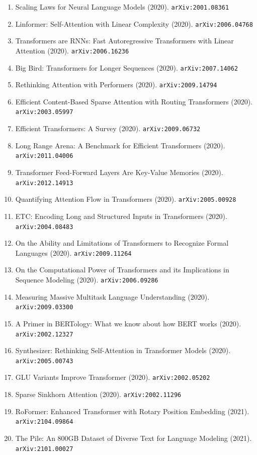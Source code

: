 \documentclass[11pt]{article}
\begin{document}
\begin{enumerate}
  \item Scaling Laws for Neural Language Models (2020). \texttt{arXiv:2001.08361}
  \item Linformer: Self-Attention with Linear Complexity (2020). \texttt{arXiv:2006.04768}
  \item Transformers are RNNs: Fast Autoregressive Transformers with Linear
  Attention (2020). \texttt{arXiv:2006.16236}
  \item Big Bird: Transformers for Longer Sequences (2020). \texttt{arXiv:2007.14062}
  \item Rethinking Attention with Performers (2020). \texttt{arXiv:2009.14794}
  \item Efficient Content-Based Sparse Attention with Routing Transformers (2020). \texttt{arXiv:2003.05997}
  \item Efficient Transformers: A Survey (2020). \texttt{arXiv:2009.06732}
  \item Long Range Arena: A Benchmark for Efficient Transformers (2020). \texttt{arXiv:2011.04006}
  \item Transformer Feed-Forward Layers Are Key-Value Memories (2020). \texttt{arXiv:2012.14913}
  \item Quantifying Attention Flow in Transformers (2020). \texttt{arXiv:2005.00928}
  \item ETC: Encoding Long and Structured Inputs in Transformers (2020). \texttt{arXiv:2004.08483}
  \item On the Ability and Limitations of Transformers to Recognize Formal
  Languages (2020). \texttt{arXiv:2009.11264}
  \item On the Computational Power of Transformers and its Implications in
  Sequence Modeling (2020). \texttt{arXiv:2006.09286}
  \item Measuring Massive Multitask Language Understanding (2020). \texttt{arXiv:2009.03300}
  \item A Primer in BERTology: What we know about how BERT works (2020). \texttt{arXiv:2002.12327}
  \item Synthesizer: Rethinking Self-Attention in Transformer Models (2020). \texttt{arXiv:2005.00743}
  \item GLU Variants Improve Transformer (2020). \texttt{arXiv:2002.05202}
  \item Sparse Sinkhorn Attention (2020). \texttt{arXiv:2002.11296}
  \item RoFormer: Enhanced Transformer with Rotary Position Embedding (2021). \texttt{arXiv:2104.09864}
  \item The Pile: An 800GB Dataset of Diverse Text for Language Modeling (2021). \texttt{arXiv:2101.00027}

\end{enumerate}
\end{document}
